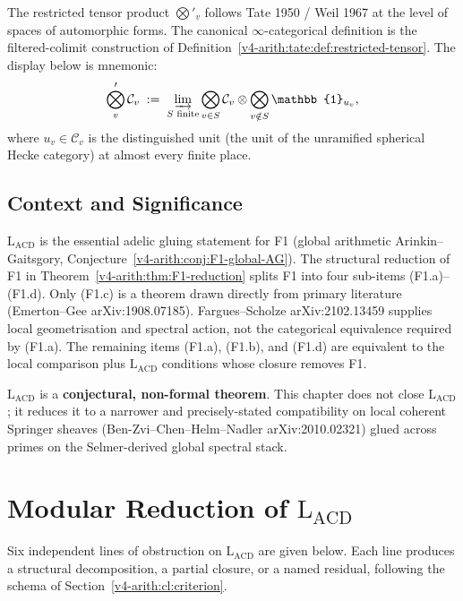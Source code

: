 The restricted tensor product \(\bigotimes'_{v}\) follows Tate 1950 /
Weil 1967 at the level of spaces of automorphic forms. The canonical
\(\infty\)-categorical definition is the filtered-colimit construction
of Definition~\ref{v4-arith:tate:def:restricted-tensor}. The display below is
mnemonic:
\begin{equation}
\label{v4-arith:acd:eq:restricted-tp}
\bigotimes_{v}^{\prime}\mathcal{C}_{v}
\;:=\;
\varinjlim_{S\text{ finite}}
\bigotimes_{v\in S}\mathcal{C}_{v}\otimes\bigotimes_{v\notin S}\mathbb{1}_{u_{v}},
\end{equation}
where \(u_{v}\in\mathcal{C}_{v}\) is the distinguished unit
(the unit of the unramified spherical Hecke category) at almost every
finite place.

\subsection{Context and Significance}

\(\mathrm{L}_{\mathrm{ACD}}\) is the essential adelic gluing
statement for F1 (global arithmetic Arinkin--Gaitsgory,
Conjecture~\ref{v4-arith:conj:F1-global-AG}). The structural reduction of F1
in Theorem~\ref{v4-arith:thm:F1-reduction} splits F1 into four sub-items
 (F1.a)--(F1.d). Only (F1.c) is a theorem drawn directly from
 primary literature (Emerton--Gee arXiv:1908.07185). Fargues--Scholze
 arXiv:2102.13459 supplies local geometrisation and spectral action,
 not the categorical equivalence required by (F1.a). The remaining
 items (F1.a), (F1.b), and (F1.d) are equivalent to the local
comparison plus \(\mathrm{L}_{\mathrm{ACD}}\) conditions whose
closure removes F1.

\(\mathrm{L}_{\mathrm{ACD}}\) is a
\textbf{conjectural, non-formal theorem}. This chapter does not
close \(\mathrm{L}_{\mathrm{ACD}}\); it reduces it to a narrower and
precisely-stated compatibility on local coherent Springer sheaves
(Ben-Zvi--Chen--Helm--Nadler arXiv:2010.02321) glued across primes
on the Selmer-derived global spectral stack.

\section{Modular Reduction of \(\mathrm{L}_{\mathrm{ACD}}\)}
\label{v4-arith:acd:obstruction-analysis}

Six independent lines of obstruction on \(\mathrm{L}_{\mathrm{ACD}}\) are
given below. Each line produces a structural decomposition, a partial
closure, or a named residual, following the schema of
Section~\ref{v4-arith:cl:criterion}.

